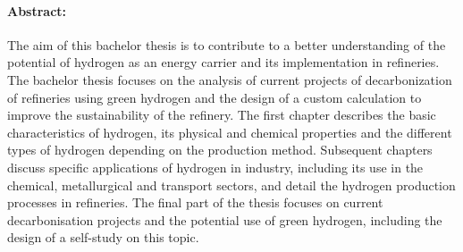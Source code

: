 \paragraph*{\textbf{Abstract:}}
The aim of this bachelor thesis is to contribute to a better understanding of the potential of hydrogen as an energy carrier and its implementation in refineries. The bachelor thesis focuses on the analysis of current projects of decarbonization of refineries using green hydrogen and the design of a custom calculation to improve the sustainability of the refinery. The first chapter describes the basic characteristics of hydrogen, its physical and chemical properties and the different types of hydrogen depending on the production method. Subsequent chapters discuss specific applications of hydrogen in industry, including its use in the chemical, metallurgical and transport sectors, and detail the hydrogen production processes in refineries. The final part of the thesis focuses on current decarbonisation projects and the potential use of green hydrogen, including the design of a self-study on this topic.